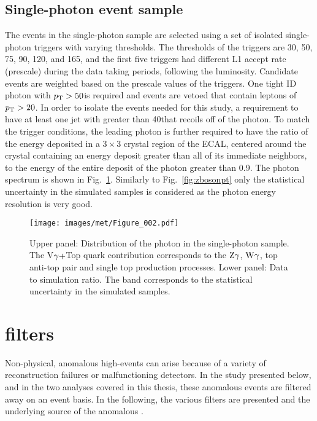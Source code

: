 \subsection{Single-photon event sample}
\label{sec:photonselection}
The events in the single-photon sample are selected using a set of isolated single-photon triggers with varying thresholds. 
The \pt thresholds of the triggers are 30, 50, 75, 90, 120, and 165\GeV, and the first five triggers had different L1 accept rate (prescale) during the data taking periods, following the luminosity. 
Candidate events are weighted based on the prescale values of the triggers.
One tight ID photon with $p_{\mathrm{T}} > 50$\GeV is required and events are vetoed that contain leptons of $p_{\mathrm{T}} > 20$\GeV. 
In order to isolate the events needed for this study, a requirement to have at least one jet with \pt greater than 40\GeV that recoils off of the photon. 
To match the trigger conditions, the leading photon is further required to have the ratio of the energy deposited in a $3\times3$ crystal region of the ECAL, centered around the crystal containing an energy deposit greater than all of its immediate neighbors, to the energy of the entire deposit of the photon greater than 0.9.
The photon \qt spectrum is shown in Fig.~\ref{fig:gbosonpt}. 
Similarly to Fig.~\ref{fig:zbosonpt} only the statistical uncertainty in the simulated samples is considered as the photon energy resolution is very good.
\begin{figure}[!htb]
  \centering
  \texttt{[image: images/met/Figure\_002.pdf]}
  \caption{Upper panel: Distribution of the photon \qt in the single-photon sample. The V$\gamma+$Top quark contribution corresponds to the $\mathrm{Z}\gamma$, $\mathrm{W}\gamma$, top anti-top pair and single top production processes. Lower panel: Data to simulation ratio. The band corresponds to the statistical uncertainty in the simulated samples.  }
  \label{fig:gbosonpt}
\end{figure}                                                                                                                                                                 
\section{\ptmiss filters}                                                                                                                                     
\label{sec:filters}
Non-physical, anomalous high-\ptmiss events can arise because of a variety of reconstruction failures or malfunctioning detectors.  
In the \ptmiss study presented below, and in the two analyses covered in this thesis, these anomalous \ptmiss events are filtered away on an event basis. 
In the following, the various filters are presented and the underlying source of the anomalous \ptmiss. 
